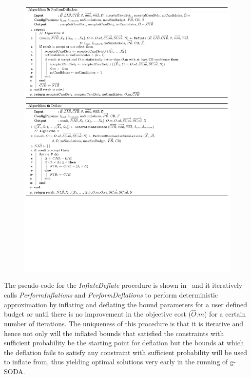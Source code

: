 \documentclass[a4paper, 12pt]{article} %
\begin{document}
\begin{figure}
\begin{minipage}[t]{.5\textwidth}
\begin{center}
\includegraphics[width=1\textwidth]{pseudoCode/Algo5-6.pdf}
	\end{center}
\end{minipage}
\end{figure}

The pseudo-code for the \textit{InflateDeflate} procedure is shown in \algoInflDefl~and it iteratively calls \textit{PerformInflations} and \textit{PerformDeflations} to perform deterministic approximation by inflating and deflating the bound parameters for a user defined budget or until there is no improvement in the objective cost ($\hat{O}.m$) for a certain number of iterations. The uniqueness of this procedure is that it is iterative and hence not only will the inflated bounds that satisfied the constraints with sufficient probability be the starting point for deflation but the bounds at which the deflation fails to satisfy any constraint with sufficient probability will be used to inflate from, thus yielding optimal solutions very early in the running of g-SODA.
\end{document}
